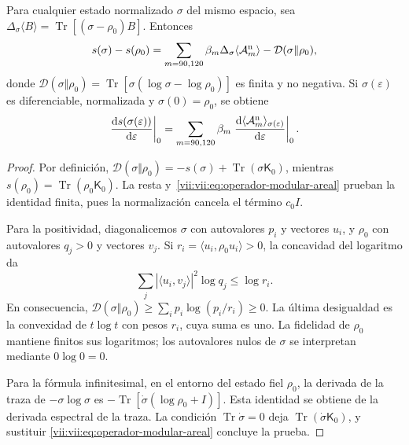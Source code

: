 \begin{theorem}
\label{vii:vii:thm:ley-modular-finita}
Para cualquier estado normalizado \(\sigma\) del mismo espacio, sea
\(\Delta_\sigma\langle B\rangle
=\operatorname{Tr}[(\sigma-\rho_0)B]\). Entonces
\begin{equation}
 s(\sigma)-s(\rho_0)
 =\sum_{m=90,120}\beta_m\Delta_\sigma\langle\mathcal A_m^{\rm n}\rangle
  -\mathcal D(\sigma\Vert\rho_0),
 \label{vii:vii:eq:ley-modular-finita}
\end{equation}
donde
\(\mathcal D(\sigma\Vert\rho_0)
=\operatorname{Tr}[\sigma(\log\sigma-\log\rho_0)]\)
es finita y no negativa. Si \(\sigma(\varepsilon)\) es diferenciable,
normalizada y \(\sigma(0)=\rho_0\), se obtiene
\begin{equation}
 \left.\frac{\mathrm ds(\sigma(\varepsilon))}{\mathrm d\varepsilon}\right|_0
 =\sum_{m=90,120}\beta_m
   \left.\frac{\mathrm d\langle\mathcal A_m^{\rm n}\rangle_{
                 \sigma(\varepsilon)}}{\mathrm d\varepsilon}\right|_0.
 \label{vii:vii:eq:primera-ley-modular}
\end{equation}
\end{theorem}
\begin{proof}
Por definición,
\(\mathcal D(\sigma\Vert\rho_0)=-s(\sigma)
+\operatorname{Tr}(\sigma\mathsf K_0)\), mientras
\(s(\rho_0)=\operatorname{Tr}(\rho_0\mathsf K_0)\).
La resta y~\eqref{vii:vii:eq:operador-modular-areal} prueban la identidad
finita, pues la normalización cancela el término \(c_0I\).

Para la positividad, diagonalicemos \(\sigma\) con autovalores
\(p_i\) y vectores \(u_i\), y \(\rho_0\) con autovalores
\(q_j>0\) y vectores \(v_j\). Si
\(r_i=\langle u_i,\rho_0u_i\rangle>0\), la concavidad del
logaritmo da
\[
 \sum_j|\langle u_i,v_j\rangle|^2\log q_j\le\log r_i.
\]
En consecuencia,
\(\mathcal D(\sigma\Vert\rho_0)
\ge\sum_i p_i\log(p_i/r_i)\ge0\).
La última desigualdad es la convexidad de \(t\log t\) con pesos
\(r_i\), cuya suma es uno. La fidelidad de \(\rho_0\) mantiene
finitos sus logaritmos; los autovalores nulos de \(\sigma\) se
interpretan mediante \(0\log0=0\).

Para la fórmula infinitesimal, en el entorno del estado fiel \(\rho_0\),
la derivada de la traza de \(-\sigma\log\sigma\) es
\(-\operatorname{Tr}[\dot\sigma(\log\rho_0+I)]\).
Esta identidad se obtiene de la derivada espectral de la traza.
La condición \(\operatorname{Tr}\dot\sigma=0\) deja
\(\operatorname{Tr}(\dot\sigma\mathsf K_0)\), y sustituir
\eqref{vii:vii:eq:operador-modular-areal} concluye la prueba.
\end{proof}

